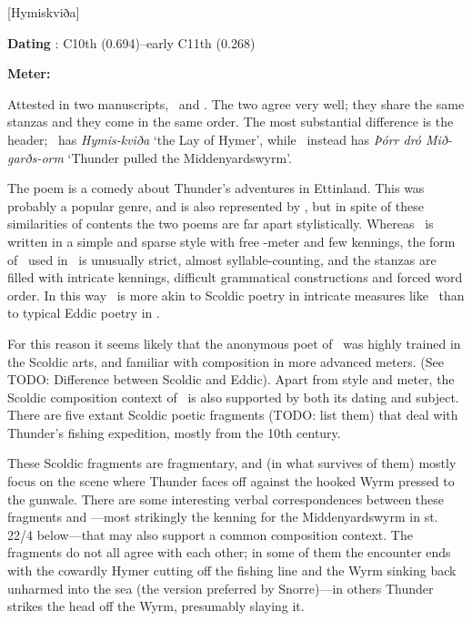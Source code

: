 [Hymiskviða]

\begin{flushright}%
\textbf{Dating} \parencite{Sapp2022}: C10th (0.694)–early C11th (0.268)

\textbf{Meter:} \Fornyrdislag%
\end{flushright}%

Attested in two manuscripts, \Regius\ and \AM.  The two agree very well; they share the same stanzas and they come in the same order.  The most substantial difference is the header; \AM\ has \emph{Hymis-kviða} ‘the Lay of Hymer’, while \Regius\ instead has \emph{Þórr dró Mið-garðs-orm} ‘Thunder pulled the Middenyardswyrm’.

The poem is a comedy about Thunder’s adventures in Ettinland.  This was probably a popular genre, and is also represented by \Thrymskvida, but in spite of these similarities of contents the two poems are far apart stylistically.  Whereas \Thrymskvida\ is written in a simple and sparse style with free \Fornyrdislag-meter and few kennings, the form of \Fornyrdislag\ used in \Hymiskvida\ is unusually strict, almost syllable-counting, and the stanzas are filled with intricate kennings, difficult grammatical constructions and forced word order.  In this way \Hymiskvida\ is more akin to Scoldic poetry in intricate measures like \Drottkvett\ than to typical Eddic poetry in \Fornyrdislag.

For this reason it seems likely that the anonymous poet of \Hymiskvida\ was highly trained in the Scoldic arts, and familiar with composition in more advanced meters.  (See TODO: Difference between Scoldic and Eddic).  Apart from style and meter, the Scoldic composition context of \Hymiskvida\ is also supported by both its dating and subject.  There are five extant Scoldic poetic fragments (TODO: list them) that deal with Thunder’s fishing expedition, mostly from the 10th century.

These Scoldic fragments are fragmentary, and (in what survives of them) mostly focus on the scene where Thunder faces off against the hooked Wyrm pressed to the gunwale.  There are some interesting verbal correspondences between these fragments and \Hymiskvida—most strikingly the kenning for the Middenyardswyrm in st. 22/4 below—that may also support a common composition context.  The fragments do not all agree with each other; in some of them the encounter ends with the cowardly Hymer cutting off the fishing line and the Wyrm sinking back unharmed into the sea (the version preferred by Snorre)—in others Thunder strikes the head off the Wyrm, presumably slaying it.

